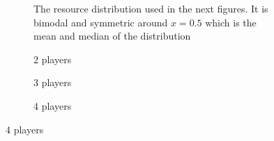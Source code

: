 \documentclass{article}
\begin{document}
            \begin{figure}[ht!] 
                \centering
                \begin{subfigure}[b]{0.4\linewidth}
                    \centering
                    
                    \caption{The resource distribution used in the next figures. It is bimodal and symmetric around $x=0.5$ which is the mean and median of the distribution}
                    \label{fig1:a}
                \end{subfigure}
                
                \begin{subfigure}[b]{0.3\linewidth}
                    \centering
                     
                    \caption{2 players} 
                    \label{fig1:b} 
                    \vspace{4ex}
                \end{subfigure}%
                \begin{subfigure}[b]{0.3\linewidth}
                    \centering
                     
                    \caption{3 players} 
                    \label{fig1:c} 
                    \vspace{4ex}
                \end{subfigure} 
                \begin{subfigure}[b]{0.3\linewidth}
                    \centering
                     
                    \caption{4 players} 
                    \label{fig1:d}
                    \vspace{4ex}
                \end{subfigure}%
                

\end{figure}
\end{document}
